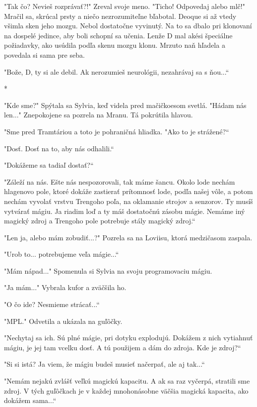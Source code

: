 \documentclass{book}
\begin{document}
"$ $Tak čo? Nevieš rozprávať?!"$ $ Zreval svoje meno. "$ $Ticho! Odpovedaj alebo mlč!"$ $ Mračil sa, skrúcal prsty a niečo nezrozumiteľne bľabotal. Deoque si až vtedy všimla sken jeho mozgu. Nebol dostatočne vyvinutý. Na to sa dbalo pri klonovaní na dospelé jedince, aby boli schopní sa učenia. Lenže D mal akési špeciálne požiadavky, ako usúdila podľa skenu mozgu klonu. Mrzuto naň hľadela a povedala si sama pre seba.

"$ $Bože, D, ty si ale debil. Ak nerozumieš neurológii, nezahrávaj sa s ňou...“

\begin{center}

*

\end{center}

"$ $Kde sme?"$ $ Spýtala sa Sylvia, keď videla pred mačičkoesom svetlá. "$ $Hádam nás len..."$ $ Znepokojene sa pozrela na Mranu. Tá pokrútila hlavou.

"$ $Sme pred Tramtáriou a toto je pohraničná hliadka. "$ $Ako to je strážené?“

"$ $Dosť. Dosť na to, aby nás odhalili.“

"$ $Dokážeme sa tadiaľ dostať?“

"$ $Záleží na nás. Ešte nás nespozorovali, tak máme šancu. Okolo lode nechám hlagenovo pole, ktoré dokáže zastierať prítomnosť lode, podľa našej vôle, a potom nechám vyvolať vrstvu Trengoho poľa, na oklamanie strojov a senzorov. Ty musíš vytvárať mágiu. Ja riadim loď a ty máš dostatočnú zásobu mágie. Nemáme iný magický zdroj a Trengoho pole potrebuje stály magický zdroj.“

"$ $Len ja, alebo mám zobudiť...?"$ $ Pozrela sa na Loviisu, ktorá medzičasom zaspala.

"$ $Urob to... potrebujeme veľa mágie...“

"$ $Mám nápad..."$ $ Spomenula si Sylvia na svoju programovaciu mágiu.

"$ $Ja mám..."$ $ Vybrala kufor a zväčšila ho.

"$ $O čo ide? Nesmieme strácať...“

"$ $MPL."$ $ Odvetila a ukázala na guľôčky.

"$ $Nechytaj sa ich. Sú plné mágie, pri dotyku explodujú. Dokážem z nich vytiahnuť mágiu, je jej tam vcelku dosť. A tú použijem a dám do zdroja. Kde je zdroj?“

"$ $Si si istá? Ja viem, že mágiu budeš musieť načerpať, ale aj tak...“

"$ $Nemám nejakú zvlášť veľkú magickú kapacitu. A ak sa raz vyčerpá, stratili sme zdroj. V tých guľôčkach je v každej mnohonásobne väčšia magická kapacita, ako dokážem sama...“
\end{document}
